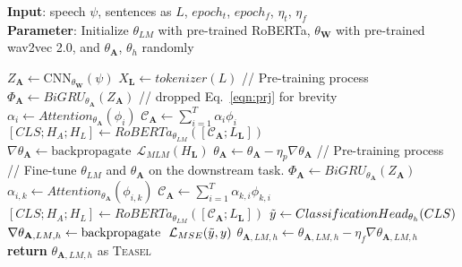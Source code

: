 \documentclass[letterpaper]{article} \usepackage{spconf,amsmath,graphicx}
\newcommand{\teasel}{\textsc{Teasel }}
\begin{document}
\begin{algorithm}[tb]
\caption{\teasel Model}
\label{alg:TEASEL_algorithm}
\textbf{Input}: speech $\psi$, sentences as $L$,  $epoch_{t}$, $epoch_{f}$, $\eta_{t}$, $\eta_{f}$\\
\textbf{Parameter}: Initialize $\theta_{LM}$ with pre-trained RoBERTa, $\theta_{\mathbf{W}}$ with pre-trained wav2vec 2.0, and $\theta_{\mathbf{A}}$, $\theta_{h}$ randomly \\
\begin{algorithmic}[1] \STATE $Z_{\mathbf{A}} \gets \text{CNN}_{\theta_{\mathbf{W}}}(\psi)$
\STATE $X_{\mathbf{L}} \gets tokenizer(L)$
\STATE // Pre-training process
    \STATE $\Phi_{\mathbf{A}} \gets BiGRU_{\theta_{\mathbf{A}}}(Z_{\mathbf{A}})$ // dropped Eq.~\ref{eqn:prj} for brevity
    \STATE $\alpha_{i} \gets Attention_{\theta_{\mathbf{A}}}(\phi_{i})$
    \STATE $\mathcal{C}_{\mathbf{A}} \gets \sum_{i=1}^{T} \alpha_{i} \phi_{i}$
    \STATE $[CLS; H_{A}; H_{L}] \gets RoBERTa_{\theta_{LM}}([\mathcal{C}_{\mathbf{A}}; L_{\mathbf{L}}])$
    \STATE $\nabla \theta_{\mathbf{A}} \gets \text{backpropagate}~~\mathcal{L}_{MLM}(H_{\mathbf{L}})$
\STATE $\theta_{\mathbf{A}} \gets \theta_{\mathbf{A}} - \eta_{p} \nabla \theta_{\mathbf{A}}$ 
\ENDFOR
\STATE // Pre-training process
\STATE // Fine-tune $\theta_{LM}$ and $\theta_{\mathbf{A}}$ on the downstream task.
    \STATE $\Phi_{\mathbf{A}} \gets BiGRU_{\theta_{\mathbf{A}}}(Z_{\mathbf{A}})$
    \STATE $\alpha_{i, k} \gets Attention_{\theta_{\mathbf{A}}}(\phi_{i, k})$
    \STATE $\mathcal{C}_{\mathbf{A}} \gets \sum_{i=1}^{T} \alpha_{k, i} \phi_{k, i}$
    \STATE $[CLS; H_{A}; H_{L}] \gets RoBERTa_{\theta_{LM}}([\mathcal{C}_{\mathbf{A}}; L_{\mathbf{L}}])$
    \STATE $\Tilde{y} \gets ClassificationHead_{\theta_{h}}(CLS)$
    \STATE $\nabla \theta_{\mathbf{A}, LM, h}  \gets \text{backpropagate}~~\mathcal{L}_{MSE}(\Tilde{y}, y)$
    \STATE $\theta_{\mathbf{A}, LM, h} \gets \theta_{\mathbf{A}, LM, h}  -\eta_{f} \nabla \theta_{\mathbf{A}, LM, h} $ 
\ENDFOR
\STATE \textbf{return} $\theta_{\mathbf{A}, LM, h}$ as \teasel
\end{algorithmic}
\end{algorithm}
\end{document}
